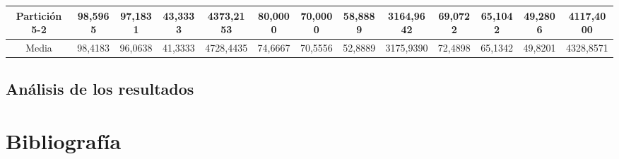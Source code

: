 \documentclass[12pt]{article}
\begin{document}
\begin{table}[H]
{\begin{tabular}{|c|cccc|cccc|cccc|}
Partición 5-2 & \multicolumn{1}{c|}{98,5965}                                                  & \multicolumn{1}{c|}{97,1831}                                                 & \multicolumn{1}{c|}{43,3333} & 4373,2153 & \multicolumn{1}{c|}{80,0000}                                                  & \multicolumn{1}{c|}{70,0000}                                                 & \multicolumn{1}{c|}{58,8889} & 3164,9642 & \multicolumn{1}{c|}{69,0722}                                                  & \multicolumn{1}{c|}{65,1042}                                                 & \multicolumn{1}{c|}{49,2806} & 4117,4000 \\ \hline
Media         & \multicolumn{1}{c|}{98,4183}                                                  & \multicolumn{1}{c|}{96,0638}                                                 & \multicolumn{1}{c|}{41,3333} & 4728,4435 & \multicolumn{1}{c|}{74,6667}                                                  & \multicolumn{1}{c|}{70,5556}                                                 & \multicolumn{1}{c|}{52,8889} & 3175,9390 & \multicolumn{1}{c|}{72,4898}                                                  & \multicolumn{1}{c|}{65,1342}                                                 & \multicolumn{1}{c|}{49,8201} & 4328,8571 \\ \hline
\end{tabular}}
\end{table}



\subsection{Análisis de los resultados}

\section{Bibliografía}
\end{document}
